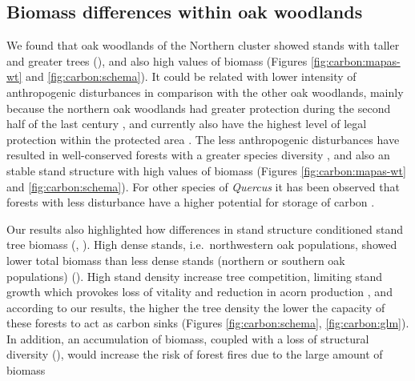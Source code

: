 \subsection{Biomass differences within oak woodlands}\label{sec:carbon:discussion-differences}
We found that oak woodlands of the Northern cluster showed stands with taller and greater trees (), and also high values of biomass (Figures \ref{fig:carbon:mapas-wt} and \ref{fig:carbon:schema}). It could be related with lower intensity of anthropogenic disturbances in comparison with the other oak woodlands, mainly because the northern oak woodlands had greater protection during the second half of the last century \autocite{JimenezOlivencia1991PaisajesSierra}, and currently also have the highest level of legal protection within the protected area \autocite{Anonymous2011Decreto238}. The less anthropogenic disturbances have resulted in well-conserved forests with a greater species diversity \autocite{PerezLuqueetal2021EcologicalDiversity}, and also an stable stand structure with high values of biomass (Figures \ref{fig:carbon:mapas-wt} and \ref{fig:carbon:schema}). For other species of \emph{Quercus} it has been observed that forests with less disturbance have a higher potential for storage of carbon \autocite{BalboaMuriasetal2006CarbonNutrient,Cotillasetal2016AbovegroundBelowground,Stojanovicetal2017ForecastingTree}.

Our results also highlighted how differences in stand structure conditioned stand tree biomass (, ). High dense stands, i.e.~northwestern oak populations, showed lower total biomass than less dense stands (northern or southern oak populations) (). High stand density increase tree competition, limiting stand growth which provokes loss of vitality and reduction in acorn production \autocite{Bravoetal2008SelviculturaMontes,Piqueetal2018Spain}, and according to our results, the higher the tree density the lower the capacity of these forests to act as carbon sinks (Figures \ref{fig:carbon:schema}, \ref{fig:carbon:glm}). In addition, an accumulation of biomass, coupled with a loss of structural diversity (), would increase the risk of forest fires due to the large amount of biomass \autocite{Canellasetal2004GrowthResponse,PiqueVericat2015EvolutionPerspectives,Serradaetal1992CoppiceSystem}

